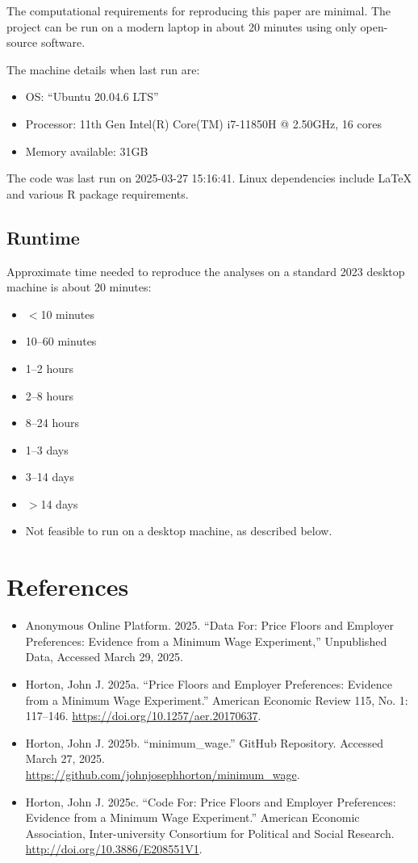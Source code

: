 \documentclass[10pt]{article}
\begin{document}
The computational requirements for reproducing this paper are minimal. The project can be run on a modern laptop in about 20 minutes using only open-source software.

The machine details when last run are:
\begin{itemize}
  \item OS: ``Ubuntu 20.04.6 LTS''
  \item Processor: 11th Gen Intel(R) Core(TM) i7-11850H @ 2.50GHz, 16 cores
  \item Memory available: 31GB
\end{itemize}

The code was last run on 2025-03-27 15:16:41. Linux dependencies include LaTeX and various R package requirements.

\subsection{Runtime}
Approximate time needed to reproduce the analyses on a standard 2023 desktop machine is about 20 minutes:
\begin{itemize}[label=]
  \item $<$10 minutes
  \item [\ding{51}] 10--60 minutes
  \item 1--2 hours
  \item 2--8 hours
  \item 8--24 hours
  \item 1--3 days
  \item 3--14 days
  \item $>$14 days
  \item Not feasible to run on a desktop machine, as described below.
\end{itemize}

\section{References}

\begin{itemize}
  \item Anonymous Online Platform. 2025. ``Data For: Price Floors and Employer Preferences: Evidence from a Minimum Wage Experiment,'' Unpublished Data, Accessed March 29, 2025.
  \item Horton, John J. 2025a. ``Price Floors and Employer Preferences: Evidence from a Minimum Wage Experiment.'' American Economic Review 115, No. 1: 117--146. \href{https://doi.org/10.1257/aer.20170637}{https://doi.org/10.1257/aer.20170637}.
  \item Horton, John J. 2025b. ``minimum\_wage.'' GitHub Repository. Accessed March 27, 2025. \\ \href{https://github.com/johnjosephhorton/minimum_wage}{https://github.com/johnjosephhorton/minimum\_wage}.
  \item Horton, John J. 2025c. ``Code For: Price Floors and Employer Preferences: Evidence from a Minimum Wage Experiment.'' American Economic Association, Inter-university Consortium for Political and Social Research. \\ \href{http://doi.org/10.3886/E208551V1}{http://doi.org/10.3886/E208551V1}.
\end{itemize}
\end{document}

